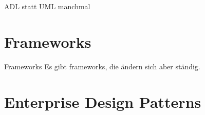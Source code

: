 \documentclass{beamer}
\begin{document}
\begin{frame}
	ADL statt UML manchmal
\end{frame}

\section{Frameworks}

\begin{frame}{Frameworks}
	Es gibt frameworks, die ändern sich aber ständig.
\end{frame}

\section{Enterprise Design Patterns}

\begin{frame}
\end{frame}






\end{document}
